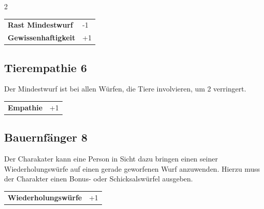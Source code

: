 \begin{multicols}{2}
\begin{tcolorbox}
\begin{tabular}{@{}ll@{}}
    \textbf{Rast Mindestwurf} & -1\\
    \textbf{Gewissenhaftigkeit} & +1\\
\end{tabular}


\end{tcolorbox}

\begin{tcolorbox}
    \subsection*{Tierempathie \hfill \small{6 }}
    \tcblower
Der Mindestwurf ist bei allen Würfen, die Tiere involvieren, um 2 verringert.


\vspace{3mm}

\begin{tabular}{@{}ll@{}}
    \textbf{Empathie} & +1\\
\end{tabular}


\end{tcolorbox}

\begin{tcolorbox}
    \subsection*{Bauernfänger \hfill \small{8 }}
    \tcblower
Der Charakater kann eine Person in Sicht dazu bringen einen seiner Wiederholungswürfe auf einen gerade geworfenen Wurf anzuwenden. Hierzu muss der Charakter einen Bonus- oder Schicksalswürfel ausgeben.


\vspace{3mm}

\begin{tabular}{@{}ll@{}}
    \textbf{Wiederholungswürfe} & +1\\
\end{tabular}



\end{tcolorbox}
\end{multicols}
